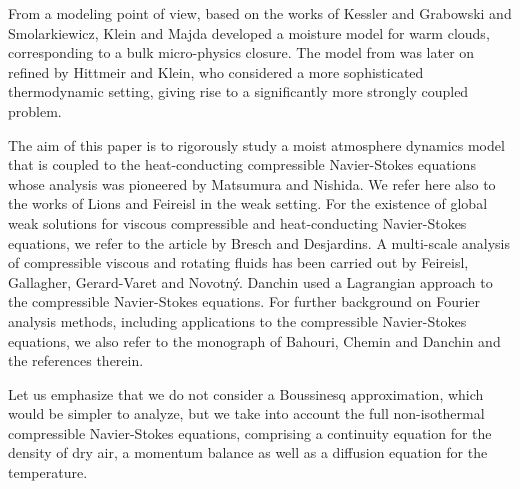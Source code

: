 \documentclass[10pt]{amsart}
\theoremstyle{plain}
\theoremstyle{definition}
\theoremstyle{thm}
\numberwithin{equation}{section}
\begin{document}
From a modeling point of view, based on the works of Kessler\cite{Kes:69} and Grabowski and Smolarkiewicz\cite{GS:96}, Klein and Majda\cite{KM:06} developed a moisture model for warm clouds, corresponding to a bulk micro-physics closure.
The model from \cite{KM:06} was later on refined by Hittmeir and Klein\cite{HK:18}, who considered a more sophisticated thermodynamic setting, giving rise to a significantly more strongly coupled problem.

The aim of this paper is to rigorously study a moist atmosphere dynamics model that is coupled to the heat-conducting compressible Navier-Stokes equations whose analysis was pioneered by Matsumura and Nishida\cite{MN:80,MN:83}.
We refer here also to the works of Lions\cite{Lio:98} and Feireisl\cite{Fei:04} in the weak setting.
For the existence of global weak solutions for viscous compressible and heat-conducting Navier-Stokes equations, we refer to the article by Bresch and Desjardins\cite{BD:07}.
A multi-scale analysis of compressible viscous and rotating fluids has been carried out by Feireisl, Gallagher, Gerard-Varet and Novotn\'y\cite{FGGVN:12}.
Danchin\cite{Dan:14} used a Lagrangian approach to the compressible Navier-Stokes equations.
For further background on Fourier analysis methods, including applications to the compressible Navier-Stokes equations, we also refer to the monograph of Bahouri, Chemin and Danchin\cite{BCD:11} and the references therein.

Let us emphasize that we do not consider a Boussinesq approximation, which would be simpler to analyze, but we take into account the full non-isothermal compressible Navier-Stokes equations, comprising a continuity equation for the density of dry air, a momentum balance as well as a diffusion equation for the temperature.
\end{document}
